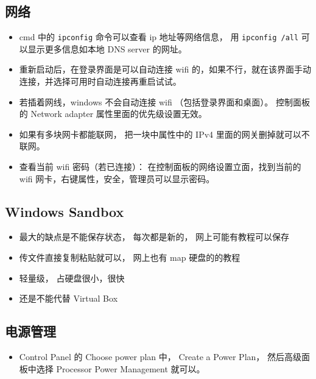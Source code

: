 \subsection{网络}
\begin{itemize}
\item cmd 中的 \verb`ipconfig` 命令可以查看 ip 地址等网络信息， 用 \verb`ipconfig /all` 可以显示更多信息如本地 DNS server 的网址。
\item 重新启动后，在登录界面是可以自动连接 wifi 的，如果不行，就在该界面手动连接，并选择可用时自动连接再重启试试。
\item 若插着网线，windows 不会自动连接 wifi （包括登录界面和桌面）。 控制面板的 Network adapter 属性里面的优先级设置无效。
\item 如果有多块网卡都能联网， 把一块中属性中的 IPv4 里面的网关删掉就可以不联网。
\item 查看当前 wifi 密码（若已连接）： 在控制面板的网络设置立面，找到当前的 wifi 网卡，右键属性，安全，管理员可以显示密码。
\end{itemize}

\subsection{Windows Sandbox}
\begin{itemize}
\item 最大的缺点是不能保存状态， 每次都是新的， 网上可能有教程可以保存
\item 传文件直接复制粘贴就可以， 网上也有 map 硬盘的的教程
\item 轻量级， 占硬盘很小，很快
\item 还是不能代替 Virtual Box
\end{itemize}

\subsection{电源管理}
\begin{itemize}
\item Control Panel 的 Choose power plan 中， Create a Power Plan， 然后高级面板中选择 Processor Power Management 就可以。
\end{itemize}
